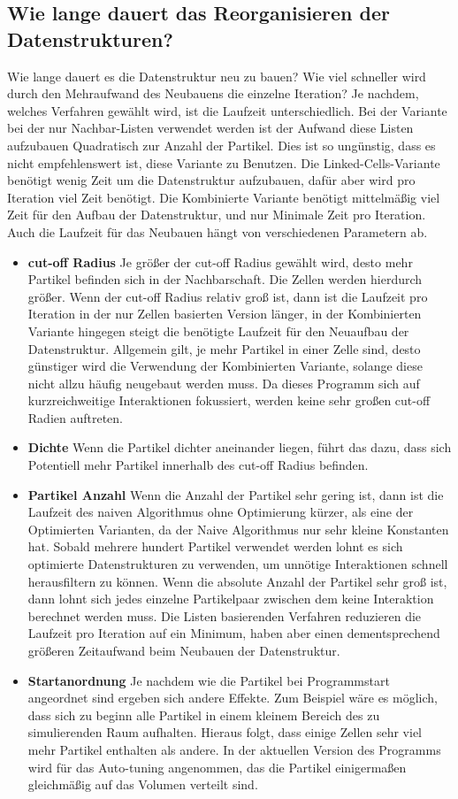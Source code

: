 \documentclass[
	12pt,
	a4paper,
	BCOR10mm,
	DIV14,
	headsepline,
]{scrreprt}
\begin{document}
\subsection{Wie lange dauert das Reorganisieren der Datenstrukturen?}
	Wie lange dauert es die Datenstruktur neu zu bauen? Wie viel schneller wird durch den Mehraufwand des Neubauens die einzelne Iteration? Je nachdem, welches Verfahren gewählt wird, ist die Laufzeit unterschiedlich. Bei der Variante bei der nur Nachbar-Listen verwendet werden ist der Aufwand diese Listen aufzubauen Quadratisch zur Anzahl der Partikel. Dies ist so ungünstig, dass es nicht empfehlenswert ist, diese Variante zu Benutzen. Die Linked-Cells-Variante benötigt wenig Zeit um die Datenstruktur aufzubauen, dafür aber wird pro Iteration viel Zeit benötigt. Die Kombinierte Variante benötigt mittelmäßig viel Zeit für den Aufbau der Datenstruktur, und nur Minimale Zeit pro Iteration. Auch die Laufzeit für das Neubauen hängt von verschiedenen Parametern ab.
	\begin{itemize}
		\item \textbf{cut-off Radius} Je größer der cut-off Radius gewählt wird, desto mehr Partikel befinden sich in der Nachbarschaft. Die Zellen werden hierdurch größer. Wenn der cut-off Radius relativ groß ist, dann ist die Laufzeit pro Iteration in der nur Zellen basierten Version länger, in der Kombinierten Variante hingegen steigt die benötigte Laufzeit für den Neuaufbau der Datenstruktur. Allgemein gilt, je mehr Partikel in einer Zelle sind, desto günstiger wird die Verwendung der Kombinierten Variante, solange diese nicht allzu häufig neugebaut werden muss. Da dieses Programm sich auf kurzreichweitige Interaktionen fokussiert, werden keine sehr großen cut-off Radien auftreten.
		\item \textbf{Dichte} Wenn die Partikel dichter aneinander liegen, führt das dazu, dass sich Potentiell mehr Partikel innerhalb des cut-off Radius befinden.
		\item \textbf{Partikel Anzahl} Wenn die Anzahl der Partikel sehr gering ist, dann ist die Laufzeit des naiven Algorithmus ohne Optimierung kürzer, als eine der Optimierten Varianten, da der Naive Algorithmus nur sehr kleine Konstanten hat. Sobald mehrere hundert Partikel verwendet werden lohnt es sich optimierte Datenstrukturen zu verwenden, um unnötige Interaktionen schnell herausfiltern zu können. Wenn die absolute Anzahl der Partikel sehr groß ist, dann lohnt sich jedes einzelne Partikelpaar zwischen dem keine Interaktion berechnet werden muss. Die Listen basierenden Verfahren reduzieren die Laufzeit pro Iteration auf ein Minimum, haben aber einen dementsprechend größeren Zeitaufwand beim Neubauen der Datenstruktur. 
		\item \textbf{Startanordnung} Je nachdem wie die Partikel bei Programmstart angeordnet sind ergeben sich andere Effekte. Zum Beispiel wäre es möglich, dass sich zu beginn alle Partikel in einem kleinem Bereich des zu simulierenden Raum aufhalten. Hieraus folgt, dass einige Zellen sehr viel mehr Partikel enthalten als andere. In der aktuellen Version des Programms wird für das Auto-tuning angenommen, das die Partikel einigermaßen gleichmäßig auf das Volumen verteilt sind.
    \newpage
	\end{itemize}
\end{document}
